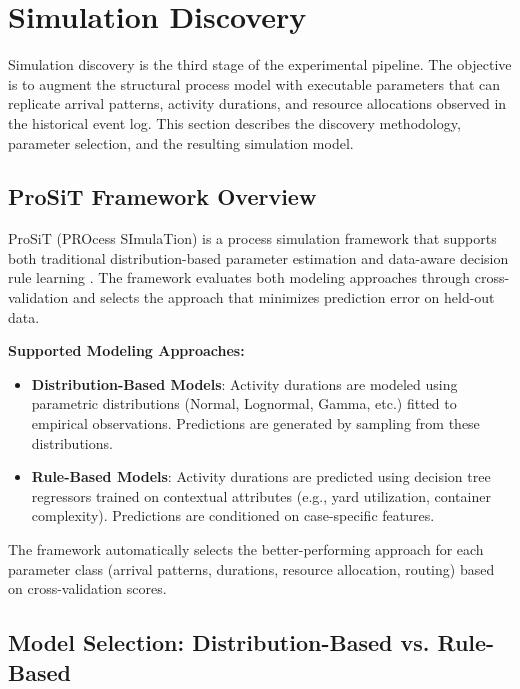 \section{Simulation Discovery}

Simulation discovery is the third stage of the experimental pipeline. The objective is to augment the structural process model with executable parameters that can replicate arrival patterns, activity durations, and resource allocations observed in the historical event log. This section describes the discovery methodology, parameter selection, and the resulting simulation model.

    \subsection{ProSiT Framework Overview}
    
    ProSiT (PROcess SImulaTion) is a process simulation framework that supports both traditional distribution-based parameter estimation and data-aware decision rule learning \cite{Vinci2026prosit}. The framework evaluates both modeling approaches through cross-validation and selects the approach that minimizes prediction error on held-out data.
    
    \textbf{Supported Modeling Approaches:}
    
    \begin{itemize}
        \item \textbf{Distribution-Based Models}: Activity durations are modeled using parametric distributions (Normal, Lognormal, Gamma, etc.) fitted to empirical observations. Predictions are generated by sampling from these distributions.
        \item \textbf{Rule-Based Models}: Activity durations are predicted using decision tree regressors trained on contextual attributes (e.g., yard utilization, container complexity). Predictions are conditioned on case-specific features.
    \end{itemize}
    
    The framework automatically selects the better-performing approach for each parameter class (arrival patterns, durations, resource allocation, routing) based on cross-validation scores.

    \subsection{Model Selection: Distribution-Based vs. Rule-Based}
    
